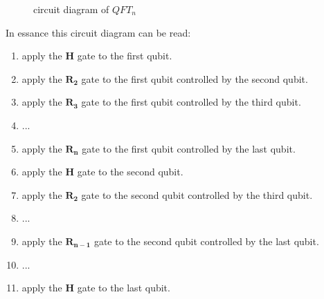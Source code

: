 \begin{figure}[H]
{
    }
    \caption{circuit diagram of $QFT_n$}
    \label{fig:QTF_n}
\end{figure}
\newcommand{\qti}{\mathbf{I}}
\newcommand{\qtr}[1]{\mathbf{R_{#1}}}
\newcommand{\qtx}{\mathbf{X}}
\newcommand{\qth}{\mathbf{H}}
\newcommand{\qtcx}{\mathbf{CX}}
In essance this circuit diagram can be read:
\begin{enumerate}
    \item apply the $\qth$ gate to the first qubit. 
    \item apply the $\qtr{2}$ gate to the first qubit controlled by the second qubit. 
    \item apply the $\qtr{3}$ gate to the first qubit controlled by the third qubit. 
    \item ... 
    \item apply the $\qtr{n}$ gate to the first qubit controlled by the last qubit. 
    \item apply the $\qth$ gate to the second qubit. 
    \item apply the $\qtr{2}$ gate to the second qubit controlled by the third qubit. 
    \item ... 
    \item apply the $\qtr{n-1}$ gate to the second qubit controlled by the last qubit. 
    \item ... 
    \item apply the $\qth$ gate to the last qubit. 
\end{enumerate}
